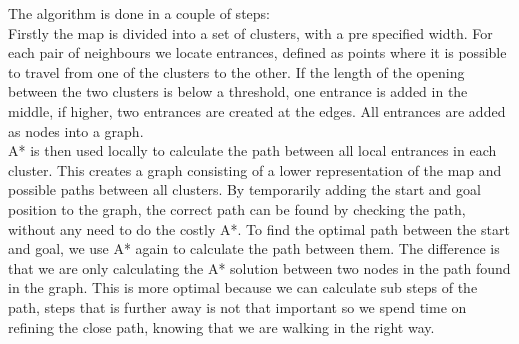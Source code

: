 \documentclass[12 pt]{article} %
\begin{document}
The algorithm is done in a couple of steps:\\

Firstly the map is divided into a set of clusters, with a pre specified width.
For each pair of neighbours we locate entrances, defined as points where it is possible to travel from one of the clusters to the other.
If the length of the opening between the two clusters is below a threshold, one entrance is added in the middle, if higher, two entrances are created at the edges.
All entrances are added as nodes into a graph.\\

A* is then used locally to calculate the path between all local entrances in each cluster. 
This creates a graph consisting of a lower representation of the map and possible paths between all clusters.
By temporarily adding the start and goal position to the graph, the correct path can be found by checking the path, without any need to do the costly A*.
To find the optimal path between the start and goal, we use A* again to calculate the path between them.
The difference is that we are only calculating the A* solution between two nodes in the path found in the graph.
This is more optimal because we can calculate sub steps of the path, steps that is further away is not that important so we spend time on refining the close path, knowing that we are walking in the right way.
\end{document}
